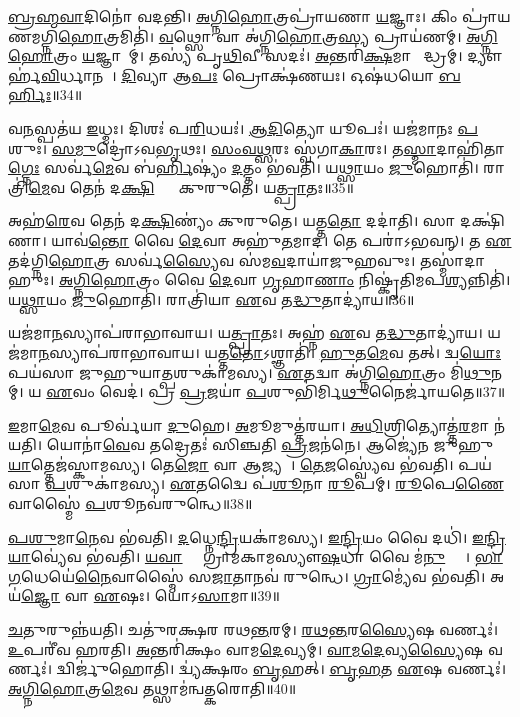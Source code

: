 \ul{𑌬𑍍𑌰}\ul{𑌹𑍍𑌮}\ul{𑌵𑌾}𑌦𑌿𑌨𑍋॑ 𑌵𑌦𑌨𑍍𑌤𑌿।
\ul{𑌅}\ul{𑌗𑍍𑌨𑌿}\ul{𑌹𑍋}𑌤𑍍𑌰𑌪𑍍𑌰𑌾॑𑌯𑌣𑌾 \ul{𑌯}𑌜𑍍𑌞𑌾𑌃।
𑌕𑌿𑌂 𑌪𑍍𑌰𑌾॑𑌯𑌣𑌮𑌗𑍍𑌨𑌿\ul{𑌹𑍋}𑌤𑍍𑌰𑌮𑌿𑌤𑌿॑।
\ul{𑌵}𑌥𑍍𑌸𑍋 𑌵𑌾 𑌅॑𑌗𑍍𑌨𑌿\ul{𑌹𑍋}𑌤𑍍𑌰\ul{𑌸𑍍𑌯} 𑌪𑍍𑌰𑌾𑌯॑𑌣𑌮𑍍।
\ul{𑌅}\ul{𑌗𑍍𑌨𑌿}\ul{𑌹𑍋}𑌤𑍍𑌰𑌂 \ul{𑌯}𑌜𑍍𑌞𑌾𑌨𑌾᳚𑌮𑍍।
𑌤𑌸𑍍𑌯॑ 𑌪𑍃\ul{𑌥𑌿}𑌵𑍀 𑌸𑌦𑌃॑।
\ul{𑌅}𑌨𑍍𑌤𑌰𑌿॑\ul{𑌕𑍍𑌷}𑌮𑌾𑌗𑍍𑌨𑍀᳚𑌦𑍍𑌧𑍍𑌰𑌮𑍍।
𑌦𑍍𑌯𑍗𑌰𑍍\mbox{}𑌹॑\ul{𑌵𑌿}𑌰𑍍𑌧𑌾𑌨𑌮𑍍᳚।
\ul{𑌦𑌿}𑌵𑍍𑌯𑌾 𑌆\ul{𑌪𑌃} 𑌪𑍍𑌰𑍋𑌕𑍍𑌷॑𑌣𑌯𑌃।
𑌓𑌷॑𑌧𑌯𑍋 \ul{𑌬}\ul{𑌰𑍍}𑌹𑌿𑌃॥34॥

𑌵\ul{𑌨}𑌸𑍍𑌪𑌤॑𑌯 \ul{𑌇}𑌧𑍍𑌮𑌃।
𑌦𑌿𑌶𑌃॑ 𑌪\ul{𑌰𑌿}𑌧𑌯𑌃॑।
\ul{𑌆}\ul{𑌦𑌿}𑌤𑍍𑌯𑍋 𑌯𑍂𑌪𑌃॑।
𑌯𑌜॑𑌮𑌾𑌨𑌃 \ul{𑌪}𑌶𑍁𑌃।
\ul{𑌸}\ul{𑌮𑍁}𑌦𑍍𑌰𑍋॑\-𑌽𑌵\ul{𑌭𑍃}𑌥𑌃।
\ul{𑌸𑌂}\ul{𑌵}\ul{𑌥𑍍𑌸}𑌰𑌃 𑌸𑍍𑌵॑𑌗𑌾\ul{𑌕𑌾}𑌰𑌃।
𑌤\ul{𑌸𑍍𑌮𑌾}𑌦𑌾𑌹𑌿॑𑌤𑌾\ul{𑌗𑍍𑌨𑍇𑌃} 𑌸𑌰𑍍𑌵॑\ul{𑌮𑍇}𑌵 𑌬॑\ul{𑌰𑍍𑌹𑌿}𑌷𑍍𑌯𑌂॑ \ul{𑌦}𑌤𑍍𑌤𑌂 𑌭॑𑌵𑌤𑌿।
𑌯\ul{𑌥𑍍𑌸𑌾}𑌯𑌂 \ul{𑌜𑍁}𑌹𑍋𑌤𑌿॑।
𑌰𑌾𑌤𑍍𑌰𑌿॑\ul{𑌮𑍇}𑌵 𑌤𑍇𑌨॑ 𑌦\ul{𑌕𑍍𑌷𑌿}𑌣𑍍𑌯𑌾𑌂᳚ 𑌕𑍁𑌰𑍁𑌤𑍇।
𑌯\ul{𑌤𑍍𑌪𑍍𑌰𑌾}𑌤𑌃॥35॥

𑌅𑌹॑\ul{𑌰𑍇}𑌵 𑌤𑍇𑌨॑ 𑌦\ul{𑌕𑍍𑌷𑌿}𑌣𑍍𑌯𑌂॑ 𑌕𑍁𑌰𑍁𑌤𑍇।
𑌯𑌤𑍍𑌤\ul{𑌤𑍋} 𑌦𑌦𑌾॑𑌤𑌿।
𑌸𑌾 𑌦𑌕𑍍𑌷𑌿॑𑌣𑌾।
𑌯𑌾𑌵॑\ul{𑌨𑍍𑌤𑍋} 𑌵𑍈 \ul{𑌦𑍇}𑌵𑌾 𑌅𑌹𑍁॑\ul{𑌤}𑌮𑌾𑌦\sn{}।
𑌤𑍇 𑌪𑌰𑌾॑\-𑌽𑌭𑌵𑌨𑍍।
𑌤 \ul{𑌏}𑌤𑌦॑𑌗𑍍𑌨𑌿\ul{𑌹𑍋}𑌤𑍍𑌰 𑌸𑌰𑍍𑌵॑\ul{𑌸𑍍𑌯𑍈}𑌵 𑌸॑𑌮\ul{𑌵}𑌦𑌾𑌯𑌾॑𑌜𑍁𑌹𑌵𑍁𑌃।
𑌤𑌸𑍍𑌮𑌾॑𑌦𑌾𑌹𑍁𑌃।
\ul{𑌅}\ul{𑌗𑍍𑌨𑌿}\ul{𑌹𑍋}𑌤𑍍𑌰𑌂 𑌵𑍈 \ul{𑌦𑍇}𑌵𑌾 \ul{𑌗𑍃}𑌹𑌾\ul{𑌣𑌾𑌂} 𑌨𑌿𑌷𑍍𑌕𑍃॑𑌤𑌿𑌮𑌪\ul{𑌶𑍍𑌯}𑌨𑍍𑌨𑌿𑌤𑌿॑।
𑌯\ul{𑌥𑍍𑌸𑌾}𑌯𑌂 \ul{𑌜𑍁}𑌹𑍋𑌤𑌿॑।
𑌰𑌾𑌤𑍍𑌰𑌿॑𑌯𑌾 \ul{𑌏}𑌵 𑌤\ul{𑌦𑍍𑌧𑍁}𑌤𑌾𑌦𑍍𑌯𑌾॑𑌯॥36॥

𑌯𑌜॑𑌮𑌾\ul{𑌨}𑌸𑍍𑌯𑌾𑌪॑𑌰𑌾\-𑌭𑌾𑌵𑌾𑌯।
𑌯\ul{𑌤𑍍𑌪𑍍𑌰𑌾}𑌤𑌃।
𑌅𑌹𑍍𑌨॑ \ul{𑌏}𑌵 𑌤\ul{𑌦𑍍𑌧𑍁}𑌤𑌾𑌦𑍍𑌯𑌾॑𑌯।
𑌯𑌜॑𑌮𑌾\ul{𑌨}𑌸𑍍𑌯𑌾𑌪॑𑌰𑌾𑌭𑌾𑌵𑌾𑌯।
𑌯𑌤𑍍𑌤\ul{𑌤𑍋}\-𑌽𑌶𑍍𑌞𑌾𑌤𑌿॑।
\ul{𑌹𑍁}𑌤\ul{𑌮𑍇}𑌵 𑌤𑌤𑍍।
𑌦𑍍𑌵\ul{𑌯𑍋𑌃} 𑌪𑌯॑𑌸𑌾 𑌜𑍁𑌹𑍁𑌯𑌾\ul{𑌤𑍍𑌪}𑌶𑍁𑌕𑌾॑𑌮𑌸𑍍𑌯।
\ul{𑌏}𑌤𑌦𑍍𑌵𑌾 𑌅॑𑌗𑍍𑌨𑌿\ul{𑌹𑍋}𑌤𑍍𑌰𑌂 𑌮𑌿॑\ul{𑌥𑍁}𑌨𑌮𑍍।
𑌯 \ul{𑌏}𑌵𑌂 𑌵𑍇𑌦॑।
𑌪𑍍𑌰 \ul{𑌪𑍍𑌰}𑌜𑌯𑌾॑ \ul{𑌪}𑌶𑍁𑌭𑌿॑𑌰𑍍𑌮𑌿\ul{𑌥𑍁}𑌨𑍈𑌰𑍍𑌜𑌾॑𑌯𑌤𑍇॥37॥

\ul{𑌇}𑌮𑌾\ul{𑌮𑍇}𑌵 𑌪𑍂𑌰𑍍𑌵॑𑌯𑌾 \ul{𑌦𑍁}𑌹𑍇।
\ul{𑌅}𑌮𑍂𑌮𑍁𑌤𑍍𑌤॑𑌰𑌯𑌾।
\ul{𑌅}\ul{𑌧𑌿}𑌶𑍍𑌰𑌿𑌤𑍍𑌯𑍋𑌤𑍍𑌤॑\ul{𑌰}𑌮𑌾 𑌨॑𑌯𑌤𑌿।
𑌯𑍋𑌨𑌾॑\ul{𑌵𑍇}𑌵 𑌤𑌦𑍍𑌰𑍇𑌤𑌃॑ 𑌸𑌿𑌞𑍍𑌚𑌤𑌿 \ul{𑌪𑍍𑌰}𑌜𑌨॑𑌨𑍇।
𑌆𑌜𑍍𑌯𑍇॑𑌨 𑌜𑍁𑌹𑍁\ul{𑌯𑌾}𑌤𑍍𑌤𑍇𑌜॑𑌸𑍍𑌕𑌾𑌮𑌸𑍍𑌯।
𑌤𑍇\ul{𑌜𑍋} 𑌵𑌾 𑌆𑌜𑍍𑌯𑌮𑍍᳚।
\ul{𑌤𑍇}\ul{𑌜}𑌸𑍍𑌵𑍍𑌯𑍇॑𑌵 𑌭॑𑌵𑌤𑌿।
𑌪𑌯॑𑌸𑌾 \ul{𑌪}𑌶𑍁𑌕𑌾॑𑌮𑌸𑍍𑌯।
\ul{𑌏}𑌤𑌦𑍍𑌵𑍈 𑌪॑\ul{𑌶𑍂}𑌨𑌾 \ul{𑌰𑍂}𑌪𑌮𑍍।
\ul{𑌰𑍂}𑌪𑍇\ul{𑌣𑍈}𑌵𑌾𑌸𑍍𑌮𑍈॑ \ul{𑌪}𑌶𑍂𑌨𑌵॑𑌰𑍁𑌨𑍍𑌧𑍇॥38॥

\ul{𑌪}\ul{𑌶𑍁}𑌮𑌾\ul{𑌨𑍇}𑌵 𑌭॑𑌵𑌤𑌿।
\ul{𑌦}𑌧𑍍𑌨𑍇\ul{𑌨𑍍𑌦𑍍𑌰𑌿}𑌯𑌕𑌾॑𑌮𑌸𑍍𑌯।
\ul{𑌇}\ul{𑌨𑍍𑌦𑍍𑌰𑌿}𑌯𑌂 𑌵𑍈 𑌦𑌧𑌿॑।
\ul{𑌇}\ul{𑌨𑍍𑌦𑍍𑌰𑌿}\ul{𑌯𑌾}𑌵𑍍𑌯𑍇॑𑌵 𑌭॑𑌵𑌤𑌿।
\ul{𑌯}\ul{𑌵𑌾}𑌗𑍍𑌵𑌾᳚ 𑌗𑍍𑌰𑌾𑌮॑𑌕𑌾𑌮𑌸𑍍𑌯𑍗\ul{𑌷}𑌧𑌾 𑌵𑍈 𑌮॑\ul{𑌨𑍁}𑌷𑍍𑌯𑌾𑌃᳚।
\ul{𑌭𑌾}\ul{𑌗}𑌧𑍇𑌯𑍇॑\ul{𑌨𑍈}𑌵𑌾𑌸𑍍𑌮𑍈॑ 𑌸\ul{𑌜𑌾}𑌤𑌾𑌨𑌵॑ 𑌰𑍁𑌨𑍍𑌧𑍇।
\ul{𑌗𑍍𑌰𑌾}𑌮𑍍𑌯𑍇॑𑌵 𑌭॑𑌵𑌤𑌿।
𑌅𑌯॑\ul{𑌜𑍍𑌞𑍋} 𑌵𑌾 \ul{𑌏}𑌷𑌃।
𑌯𑍋॑𑌽\ul{𑌸𑌾}𑌮𑌾॥39॥

\ul{𑌚}𑌤𑍁𑌰𑍁𑌨𑍍𑌨॑𑌯𑌤𑌿।
𑌚𑌤𑍁॑𑌰𑌕𑍍𑌷𑌰 𑌰𑌥\ul{𑌨𑍍𑌤}𑌰𑌮𑍍।
\ul{𑌰}\ul{𑌥}\ul{𑌨𑍍𑌤}𑌰\ul{𑌸𑍍𑌯𑍈}𑌷 𑌵𑌰𑍍𑌣𑌃॑।
\ul{𑌉}𑌪𑌰𑍀॑𑌵 𑌹𑌰𑌤𑌿।
\ul{𑌅}𑌨𑍍𑌤𑌰𑌿॑𑌕𑍍𑌷𑌂 𑌵𑌾𑌮\ul{𑌦𑍇}𑌵𑍍𑌯𑌮𑍍।
\ul{𑌵𑌾}\ul{𑌮}\ul{𑌦𑍇}𑌵𑍍𑌯\ul{𑌸𑍍𑌯𑍈}𑌷 𑌵𑌰𑍍𑌣𑌃॑।
𑌦𑍍𑌵𑌿𑌰𑍍𑌜𑍁॑𑌹𑍋𑌤𑌿।
𑌦𑍍𑌵𑍍𑌯॑𑌕𑍍𑌷𑌰𑌂 \ul{𑌬𑍃}𑌹𑌤𑍍।
\ul{𑌬𑍃}\ul{𑌹}𑌤 \ul{𑌏}𑌷 𑌵𑌰𑍍𑌣𑌃॑।
\ul{𑌅}\ul{𑌗𑍍𑌨𑌿}\ul{𑌹𑍋}𑌤𑍍𑌰\ul{𑌮𑍇}𑌵 𑌤𑌥𑍍𑌸𑌾𑌮॑𑌨𑍍𑌵𑌤𑍍𑌕𑌰𑍋𑌤𑌿॥40॥

